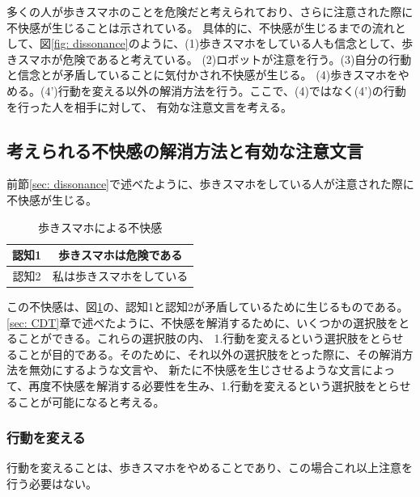 \documentclass[11pt,a4j]{jreport}
\begin{document}
多くの人が歩きスマホのことを危険だと考えられており、さらに注意された際に不快感が生じることは示されている\cite{Schneider2022}。
具体的に、不快感が生じるまでの流れとして、図\ref{fig: dissonance}のように、(1)歩きスマホをしている人も信念として、歩きスマホが危険であると考えている。
(2)ロボットが注意を行う。(3)自分の行動と信念とが矛盾していることに気付かされ不快感が生じる。
(4)歩きスマホをやめる。(4')行動を変える以外の解消方法を行う。ここで、(4)ではなく(4')の行動を行った人を相手に対して、
有効な注意文言を考える。

\subsection{考えられる不快感の解消方法と有効な注意文言}
前節\ref{sec: dissonance}で述べたように、歩きスマホをしている人が注意された際に不快感が生じる。
\begin{table}[h]
  \centering
  
  \label{fig: UsingPhone}
  \begin{tabular}{c|c}

      認知1 & 歩きスマホは危険である  \\ \hline
      認知2 & 私は歩きスマホをしている \\ 
  \end{tabular}
  \caption{歩きスマホによる不快感}
\end{table}
この不快感は、図\ref{fig: UsingPhone}の、認知1と認知2が矛盾しているために生じるものである。
\ref{sec: CDT}章で述べたように、不快感を解消するために、いくつかの選択肢をとることができる。これらの選択肢の内、
1.行動を変えるという選択肢をとらせることが目的である。そのために、それ以外の選択肢をとった際に、その解消方法を無効にするような文言や、
新たに不快感を生じさせるような文言によって、再度不快感を解消する必要性を生み、1.行動を変えるという選択肢をとらせることが可能になると考える。

\subsubsection{行動を変える}
行動を変えることは、歩きスマホをやめることであり、この場合これ以上注意を行う必要はない。
\end{document}
